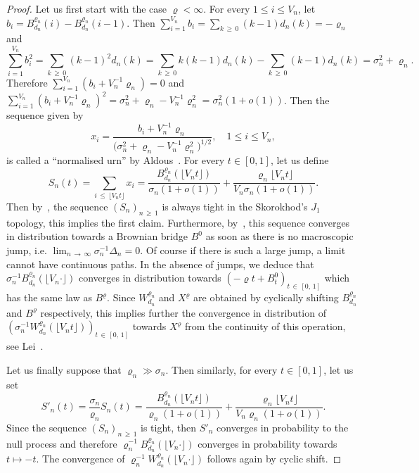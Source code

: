 \documentclass[AHL,Unicode,longabstracts,published]{cedram}
\newcommand{\1}{\ensembles{1}}
\renewcommand{\le}{\leqslant}
\renewcommand{\ge}{\geqslant}
\newcommand{\Wfn}{W_{d_n}^{\varrho_n}}
\newcommand{\Bfn}{B_{d_n}^{\varrho_n}}
\newcommand{\vertices}{V}
\begin{document}
\begin{proof}
Let us first start with the case $\varrho < \infty$. For every $1 \le i \le \vertices_n$, let $b_i = \Bfn(i) - \Bfn(i-1)$. Then $\sum_{i = 1}^{\vertices_n} b_i = \sum_{k\,\ge\, 0} (k - 1) d_n(k) = -\varrho_n$ and
\[
\sum_{i = 1}^{\vertices_n} b_i^2 = \sum_{k \,\ge\,0} (k - 1)^2 d_n(k) = \sum_{k\,\ge\,0} k (k - 1) d_n(k) - \sum_{k\,\ge\,0} (k - 1) d_n(k) = \sigma_n^2 + \varrho_n.
\]
Therefore $\sum_{i = 1}^{\vertices_n} (b_i + \vertices_n^{-1} \varrho_n) = 0$ and $\sum_{i = 1}^{\vertices_n} (b_i + \vertices_n^{-1} \varrho_n)^2 = \sigma_n^2 + \varrho_n - \vertices_n^{-1} \varrho_n^2 = \sigma_n^2 (1 + o(1))$. Then the sequence given by
\[
x_i = \frac{b_i + \vertices_n^{-1} \varrho_n}{\big(\sigma_n^2 + \varrho_n - \vertices_n^{-1} \varrho_n^2\big)^{1/2}},
\quad 1 \le i \le \vertices_n,
\]
is called a ``normalised urn'' by Aldous~\cite[Chapter~20]{Ald85}. For every $t \in [0,1]$, let us define
\[
S_n(t) = \sum_{i\,\le\,\lfloor \vertices_n t \rfloor} x_i =
\frac{\Bfn\left(\lfloor \vertices_n t \rfloor\right)}{\sigma_n (1 + o(1))} + \frac{\varrho_n \lfloor \vertices_n t \rfloor}{\vertices_n \sigma_n (1 + o(1))}.
\]
Then by~\cite[Proposition~20.3]{Ald85}, the sequence $(S_n)_{n\,\ge\,1}$ is always tight in the Skorokhod's $J_1$ topology, this implies the first claim. Furthermore, by~\cite[Theorem~20.7]{Ald85}, this sequence converges in distribution towards a Brownian bridge $B^0$ as soon as there is no macroscopic jump, i.e. $\lim_{n\,\to\,\infty} \sigma_n^{-1} \Delta_n = 0$. Of course if there is such a large jump, a limit cannot have continuous paths. In the absence of jumps, we deduce that $\sigma_n^{-1} \Bfn(\lfloor \vertices_n \cdot \rfloor)$ converges in distribution towards $(-\varrho t + B^0_t)_{t\,\in\,[0,\,1]}$ which has the same law as $B^\varrho$. Since $\Wfn$ and $X^\varrho$ are obtained by cyclically shifting $\Bfn$ and $B^\varrho$ respectively, this implies further the convergence in distribution of $(\sigma_n^{-1} \Wfn(\lfloor \vertices_n t \rfloor))_{t\,\in\,[0,\,1]}$ towards $X^\varrho$ from the continuity of this operation, see Lei~\cite[Section~4]{Lei19}.


Let us finally suppose that $\varrho_n \gg \sigma_n$. Then similarly, for every $t \in [0,1]$, let us set
\[
S'_n(t) = \frac{\sigma_n}{\varrho_n} S_n(t) = \frac{\Bfn\left(\lfloor \vertices_n t \rfloor\right)}{\varrho_n (1 + o(1))} + \frac{\varrho_n \lfloor \vertices_n t \rfloor}{\vertices_n \varrho_n (1 + o(1))}.
\]
Since the sequence $(S_n)_{n\,\ge\,1}$ is tight, then $S'_n$ converges in probability to the null process and therefore $\varrho_n^{-1} \Bfn(\lfloor \vertices_n \cdot \rfloor)$ converges in probability towards $t \mapsto -t$. The convergence of $\varrho_n^{-1} \Wfn(\lfloor \vertices_n \cdot \rfloor)$ follows again by cyclic shift.
\end{proof}
\end{document}
